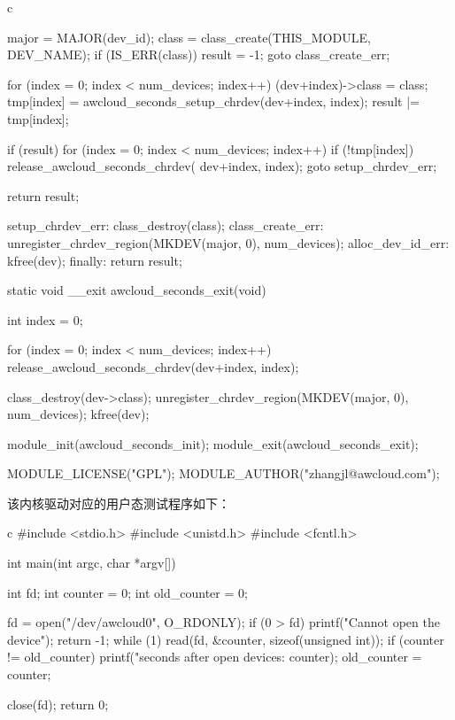 \begin{code-block}{c}
{        major = MAJOR(dev_id);
        class = class_create(THIS_MODULE, DEV_NAME);
        if (IS_ERR(class)) {
                result = -1;
                goto class_create_err;
        }

        for (index = 0; index < num_devices; index++) {
                (dev+index)->class = class;
                tmp[index] = awcloud_seconds_setup_chrdev(dev+index, index);
                result |= tmp[index];
        }

        if (result) {
                for (index = 0; index < num_devices; index++) {
                        if (!tmp[index]) {
                                release_awcloud_seconds_chrdev(
                                        dev+index, index);
                        }
                }
                goto setup_chrdev_err;
        }

        return result;

setup_chrdev_err:
        class_destroy(class);
class_create_err:
        unregister_chrdev_region(MKDEV(major, 0), num_devices);
alloc_dev_id_err:
        kfree(dev);
finally:
        return result;
}

static void __exit awcloud_seconds_exit(void)
{
        int index = 0;

        for (index = 0; index < num_devices; index++) {
                release_awcloud_seconds_chrdev(dev+index, index);
        }

        class_destroy(dev->class);
        unregister_chrdev_region(MKDEV(major, 0), num_devices);
        kfree(dev);
}

module_init(awcloud_seconds_init);
module_exit(awcloud_seconds_exit);

MODULE_LICENSE("GPL");
MODULE_AUTHOR("zhangjl@awcloud.com");
\end{code-block}
该内核驱动对应的用户态测试程序如下：
\begin{code-block}{c}
#include <stdio.h>
#include <unistd.h>
#include <fcntl.h>

int main(int argc, char *argv[])
{
        int fd;
        int counter = 0;
        int old_counter = 0;

        fd = open("/dev/awcloud0", O_RDONLY);
        if (0 > fd) {
                printf("Cannot open the device\n");
                return -1;
        }
        while (1) {
                read(fd, &counter, sizeof(unsigned int));
                if (counter != old_counter) {
                        printf("seconds after open devices:%
                                counter);
                        old_counter = counter;
                }
        }

        close(fd);
        return 0;
}
\end{code-block}
